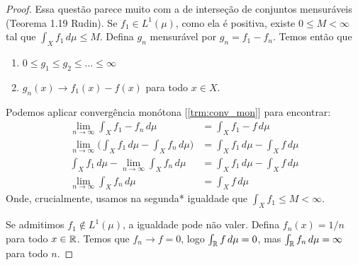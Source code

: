 \begin{problem}
    \label{prob:l2:1}
\end{problem}

\begin{proof}
    
    Essa questão parece muito com a de interseção de conjuntos mensuráveis (Teorema 1.19
    Rudin). Se $f_1 \in L^1(\mu)$, como ela é positiva, existe $0 \leq M < \infty$ tal que $\int_X f_1 \, d\mu \leq M$. Defina $g_n$ mensurável por $g_n = f_1 - f_n$. Temos então que
    \begin{enumerate}[label=(\alph*)]
        \item $0 \leq g_1 \leq g_2 \leq \dots \leq \infty$
        \item $g_n(x) \to f_1(x) - f(x)$ para todo $x \in X$.
    \end{enumerate}
    Podemos aplicar convergência monótona [\ref{trm:conv_mon}] para encontrar:
    \begin{align}
    \lim_{n\to\infty} \int_X f_1 - f_n \, d\mu &= \int_X f_1 - f \, d\mu \\
    \lim_{n\to\infty} \bigg(\int_X f_1\,d\mu  - \int_X f_n \, d\mu\bigg) &= \int_X f_1\,d\mu  - \int_Xf \, d\mu \\
    \int_X f_1\,d\mu - \lim_{n\to\infty} \int_X f_n \, d\mu&= \int_X f_1\,d\mu  - \int_Xf \, d\mu \\
    \lim_{n\to\infty} \int_X f_n \, d\mu & = \int_Xf \, d\mu
    \end{align}
    Onde, crucialmente, usamos na segunda* igualdade que $\int_X f_1 \leq M < \infty$.

    Se admitimos $f_1 \not \in L^1(\mu)$, a igualdade pode não valer. Defina $f_n(x) = 1/n$ para todo $x \in \mathbb{R}$.
    Temos que $f_n \to f = 0$, logo $\int_{\mathbb{R}} f\,d\mu = 0$, mas $\int_{\mathbb{R}} f_n\,d\mu = \infty$ para todo $n$.
\end{proof}


